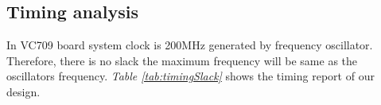 \begin{table}[]
\begin{center}
\caption {Resource Utilization per Module} \label{tab:Util}
\end{center}
\end{table}

\begin{table}[]
\begin{center}
\caption {Resource Utilization of the Architecture} \label{tab:util2}
\end{center}
\end{table}



\subsection{Timing analysis}

In VC709 board system clock is 200MHz generated by frequency oscillator. Therefore, there is no slack  the maximum frequency will be same as the oscillators frequency. \textit{Table \ref{tab:timingSlack}} shows the timing report of our design. 


